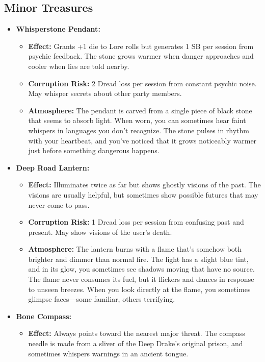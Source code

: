 \documentclass[11pt]{article}
\begin{document}
\subsection{Minor Treasures}
\begin{itemize}
\item \textbf{Whisperstone Pendant:} 
  \begin{itemize}
  \item \textbf{Effect:} Grants +1 die to Lore rolls but generates 1 SB per session from psychic feedback. The stone grows warmer when danger approaches and cooler when lies are told nearby.
  \item \textbf{Corruption Risk:} 2 Dread loss per session from constant psychic noise. May whisper secrets about other party members.
  \item \textbf{Atmosphere:} The pendant is carved from a single piece of black stone that seems to absorb light. When worn, you can sometimes hear faint whispers in languages you don't recognize. The stone pulses in rhythm with your heartbeat, and you've noticed that it grows noticeably warmer just before something dangerous happens.
  \end{itemize}
\item \textbf{Deep Road Lantern:} 
  \begin{itemize}
  \item \textbf{Effect:} Illuminates twice as far but shows ghostly visions of the past. The visions are usually helpful, but sometimes show possible futures that may never come to pass.
  \item \textbf{Corruption Risk:} 1 Dread loss per session from confusing past and present. May show visions of the user's death.
  \item \textbf{Atmosphere:} The lantern burns with a flame that's somehow both brighter and dimmer than normal fire. The light has a slight blue tint, and in its glow, you sometimes see shadows moving that have no source. The flame never consumes its fuel, but it flickers and dances in response to unseen breezes. When you look directly at the flame, you sometimes glimpse faces—some familiar, others terrifying.
  \end{itemize}
\item \textbf{Bone Compass:} 
  \begin{itemize}
  \item \textbf{Effect:} Always points toward the nearest major threat. The compass needle is made from a sliver of the Deep Drake's original prison, and sometimes whispers warnings in an ancient tongue.

\end{itemize}
\end{itemize}
\end{document}
